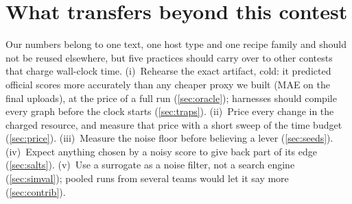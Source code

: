 \section{What transfers beyond this contest}
\label{sec:transfer}

Our numbers belong to one text, one host type and one recipe family and should not be reused elsewhere, but five
practices should carry over to other contests that charge wall-clock time. (i)~Rehearse the exact artifact, cold: it
predicted official scores more accurately than any cheaper proxy we built (MAE  on the final
uploads), at the price of a full run (\cref{sec:oracle}); harnesses should compile every graph before the clock
starts (\cref{sec:traps}). (ii)~Price every change in the charged resource, and measure
that price with a short sweep of the time budget (\cref{sec:price}). (iii)~Measure the noise floor before believing a
lever (\cref{sec:seeds}). (iv)~Expect anything chosen by a noisy score to give back part of its edge
(\cref{sec:salts}). (v)~Use a surrogate as a noise filter, not a search engine (\cref{sec:simval}); pooled runs from
several teams would let it say more (\cref{sec:contrib}).

